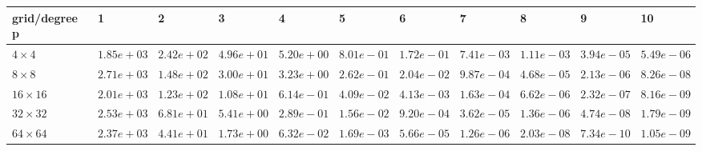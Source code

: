 \begin{tabular}{lllllllllll}
\hline
 grid/degree p   & 1          & 2          & 3          & 4          & 5          & 6          & 7          & 8          & 9          & 10         \\
\hline
 $4 \times 4$    & $1.85e+03$ & $2.42e+02$ & $4.96e+01$ & $5.20e+00$ & $8.01e-01$ & $1.72e-01$ & $7.41e-03$ & $1.11e-03$ & $3.94e-05$ & $5.49e-06$ \\
 $8 \times 8$    & $2.71e+03$ & $1.48e+02$ & $3.00e+01$ & $3.23e+00$ & $2.62e-01$ & $2.04e-02$ & $9.87e-04$ & $4.68e-05$ & $2.13e-06$ & $8.26e-08$ \\
 $16 \times 16$  & $2.01e+03$ & $1.23e+02$ & $1.08e+01$ & $6.14e-01$ & $4.09e-02$ & $4.13e-03$ & $1.63e-04$ & $6.62e-06$ & $2.32e-07$ & $8.16e-09$ \\
 $32 \times 32$  & $2.53e+03$ & $6.81e+01$ & $5.41e+00$ & $2.89e-01$ & $1.56e-02$ & $9.20e-04$ & $3.62e-05$ & $1.36e-06$ & $4.74e-08$ & $1.79e-09$ \\
 $64 \times 64$  & $2.37e+03$ & $4.41e+01$ & $1.73e+00$ & $6.32e-02$ & $1.69e-03$ & $5.66e-05$ & $1.26e-06$ & $2.03e-08$ & $7.34e-10$ & $1.05e-09$ \\
\hline
\end{tabular}